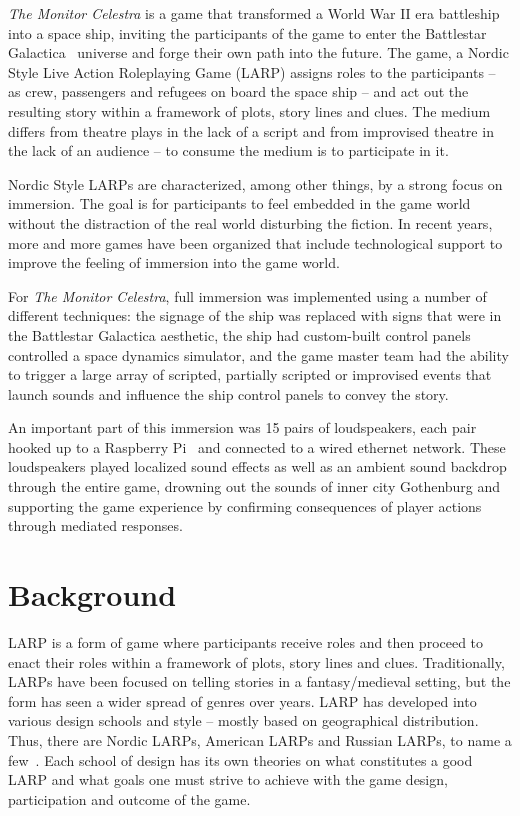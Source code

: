 \emph{The Monitor Celestra} is a game that transformed a World War II era battleship into a space ship, inviting the participants of the game to enter the Battlestar Galactica~\cite{larson_battlestar_1978} universe and forge their own path into the future. The game, a Nordic Style Live Action Roleplaying Game (LARP) assigns roles to the participants -- as crew, passengers and refugees on board the space ship -- and act out the resulting story within a framework of plots, story lines and clues. The medium differs from theatre plays in the lack of a script and from improvised theatre in the lack of an audience -- to consume the medium is to participate in it.

Nordic Style LARPs are characterized, among other things, by a strong focus on immersion. The goal is for participants to feel embedded in the game world without the distraction of the real world disturbing the fiction. In recent years, more and more games have been organized that include technological support to improve the feeling of immersion into the game world.

For \emph{The Monitor Celestra}, full immersion was implemented using a number of different techniques: the signage of the ship was replaced with signs that were
in the Battlestar Galactica aesthetic, the ship
had custom-built control panels controlled a space dynamics simulator, and the game
master team had the ability to trigger a large array of scripted, partially scripted or improvised events that launch sounds and influence the ship control panels to convey the story.

An important part of this immersion was 15 pairs of
loudspeakers, each pair hooked up to a Raspberry Pi~\cite{rpi} and
connected to a wired ethernet network. These loudspeakers played
localized sound effects as well as an ambient sound backdrop through
the entire game, drowning out the sounds of inner city Gothenburg and
supporting the game experience by confirming consequences of player
actions through mediated responses.

\section{Background}
\label{sec:background}

LARP is a form of game where participants receive roles and then proceed to enact their roles within a framework of plots, story lines and clues. Traditionally, LARPs have been focused on telling stories in a fantasy/medieval setting, but the form has seen a wider spread of genres over years. LARP has developed into various design schools and style -- mostly based on geographical distribution. Thus, there are Nordic LARPs, American LARPs and Russian LARPs, to name a few~\cite{kp2011}. Each school of design has its own theories on what constitutes a good LARP and what goals one must strive to achieve with the game design, participation and outcome of the game.

